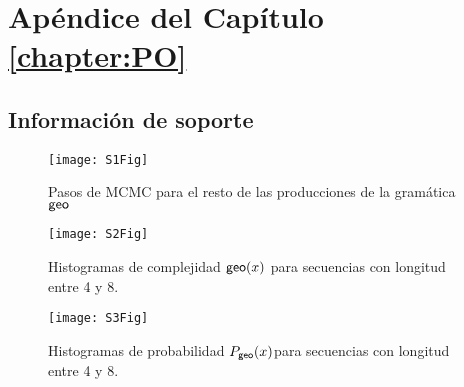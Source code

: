\chapter{Apéndice del Capítulo \ref{chapter:PO}}

\section{Información de soporte}

\begin{figure}[htpb]
    \centering
    \texttt{[image: S1Fig]}
    \caption{Pasos de MCMC para el resto de las producciones de la gramática ${\sf geo}$}
    \label{S1_Fig}
\end{figure}

\begin{figure}[htpb]
    \centering
    \texttt{[image: S2Fig]}
    \caption{Histogramas de complejidad ${\sf geo}(x)$ para secuencias con longitud entre 4 y 8.}
    \label{S2_Fig}
\end{figure}

\begin{figure}[htpb]
    \centering
    \texttt{[image: S3Fig]}
    \caption{Histogramas de probabilidad $P_{{\sf geo}}(x)$para secuencias con longitud entre 4 y 8.}
    \label{S3_Fig}
\end{figure}